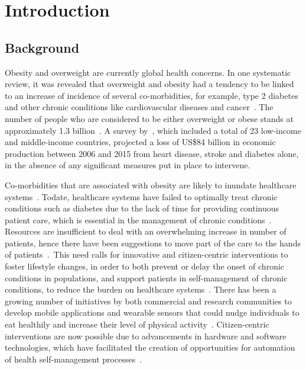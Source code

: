 
\chapter{Introduction} %

\label{introductionchapter} %


\section{Background}
Obesity and overweight are currently global health concerns. In one systematic review, it was revealed that overweight and obesity had a tendency to be linked to an increase of incidence of several co-morbidities, for example, type 2 diabetes and other chronic conditions like cardiovascular diseases and cancer~\citep{guh2009incidence}. The number of people who are considered to be either overweight or obese stands at approximately 1.3 billion~\citep{steyn2006chronic}. A survey by~\cite{abegunde:theburden}, which included a total of 23 low-income and middle-income countries, projected a loss of US\$84 billion in economic production between 2006 and 2015 from heart disease, stroke and diabetes alone, in the absence of any significant measures put in place to intervene.

Co-morbidities that are associated with obesity are likely to inundate healthcare systems~\citep{pollak2010s}. Todate, healthcare systems have failed to optimally treat chronic conditions such as diabetes due to the lack of time for providing continuous patient care, which is essential in the management of chronic conditions~\citep{quinn2008welldoc}. Resources are insufficient to deal with an overwhelming increase in number of patients, hence there have been suggestions to move part of the care to the hands of patients~\citep{aarsand2012mobile}.~This need calls for innovative and citizen-centric  interventions to foster lifestyle changes, in order to both prevent or delay the onset of chronic conditions in populations, and support patients in self-management of chronic conditions, to reduce the burden on healthcare systems~\citep{korhonen2010personal,aarsand2012mobile,higgins2016smartphone}. There has been a growing number of initiatives by both commercial and research communities to develop mobile applications and wearable sensors that could nudge individuals to eat healthily and increase their level of physical activity~\citep{chen2014healthytogether}. Citizen-centric interventions are now possible due to advancements in hardware and software technologies, which have facilitated the creation of opportunities for automation of health self-management processes~\citep{arsand:mobile}. 

